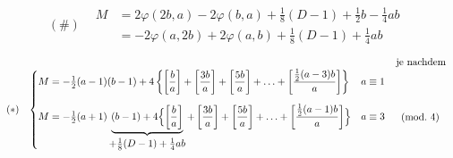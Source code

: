 \[
\begin{array}{cl}
(\#)&\begin{aligned}
M&=2\varphi(2b,a)-2\varphi(b,a)+\tfrac18(D-1)+\tfrac12b-\tfrac14ab\\
&=-2\varphi(a,2b)+2\varphi(a,b)+\tfrac18(D-1)+\tfrac14ab
\end{aligned}
\end{array}
\]
\begingroup\footnotesize
\[
\begin{array}{cll}
&&\text{je nachdem}\\
(\ast)&\left\{\begin{aligned}
M&=-\tfrac12(a-1)(b-1)+4\left\{\left[\frac ba\right]+\left[\frac{3b}a\right]+\left[\frac{5b}a\right]+\ldots+\left[\frac{\tfrac12(a-3)b}a\right]\right\}\quad a\equiv1\\[1.5ex]
M&=-\tfrac12(a+1)\underbrace{(b-1)+4\Bigl\{\left[\frac ba\right]}_{\displaystyle+\tfrac18(D-1)+\tfrac14ab}+\left[\frac{3b}a\right]+\left[\frac{5b}a\right]+\ldots+\left[\frac{\tfrac12(a-1)b}a\right]\Bigr\}\quad a\equiv3
\end{aligned}\right.&\begin{array}{l}\vphantom{\dfrac11}\\[-1ex](\mathrm{mod.}\ 4)\end{array}
\end{array}
\]
\endgroup
\clearpage

